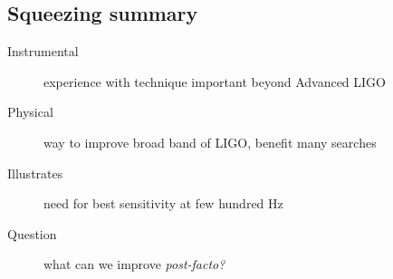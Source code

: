 

\subsection{Squeezing summary}

\begin{description}
\item [{Instrumental}] experience with technique important beyond Advanced
LIGO
\item [{Physical}] way to improve broad band of LIGO, benefit many searches
\item [{Illustrates}] need for best sensitivity at few hundred Hz
\item [{Question}] what can we improve \emph{post-facto?}
\end{description}


%
%
%

